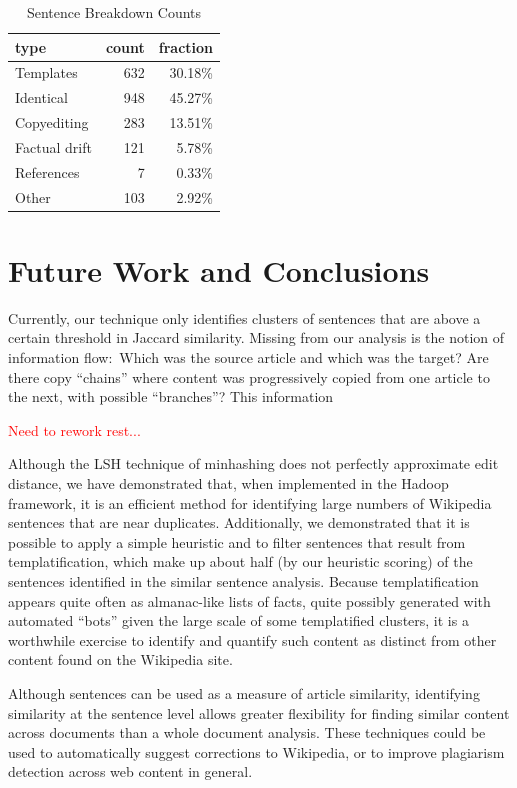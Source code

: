 \documentclass[letterpaper]{article}
\newcommand{\red}[1]{\textcolor{red}{#1}}
\begin{document}
\begin{table}
\centering
\caption{Sentence Breakdown Counts}
\vspace{0.2cm}
\begin{tabular}{| l | r | r |}
\hline
type & count & fraction \\
\hline
\hline
Templates     & 632 & 30.18\% \\ \hline
Identical     & 948 & 45.27\% \\ \hline
Copyediting   & 283 & 13.51\% \\ \hline
Factual drift & 121 &  5.78\% \\ \hline
References    &   7 &  0.33\% \\ \hline      
Other         & 103 &  2.92\% \\ \hline
\end{tabular}
\label{counts}
\end{table}

\section{Future Work and Conclusions}

Currently, our technique only identifies clusters of sentences that
are above a certain threshold in Jaccard similarity. Missing from our
analysis is the notion of information flow:\ Which was the source
article and which was the target? Are there copy ``chains'' where
content was progressively copied from one article to the next, with
possible ``branches''? This information 

\red{Need to rework rest...}

Although the LSH technique of minhashing does not perfectly approximate edit distance, we have demonstrated that, when implemented in the Hadoop framework, it is an efficient method for identifying large numbers of Wikipedia sentences that are near duplicates. Additionally, we demonstrated that it is possible to apply a simple heuristic and to filter sentences that result from templatification, which make up about half (by our heuristic scoring) of the sentences identified in the similar sentence analysis. Because templatification appears quite often as almanac-like lists of facts, quite possibly generated with automated ``bots'' given the large scale of some templatified clusters, it is a worthwhile exercise to identify and quantify such content as distinct from other content found on the Wikipedia site.

Although sentences can be used as a measure of article similarity, identifying similarity at the sentence level allows greater flexibility for finding similar content across documents than a whole document analysis. These techniques could be used to automatically suggest corrections to Wikipedia, or to improve plagiarism detection across web content in general.
\end{document}
